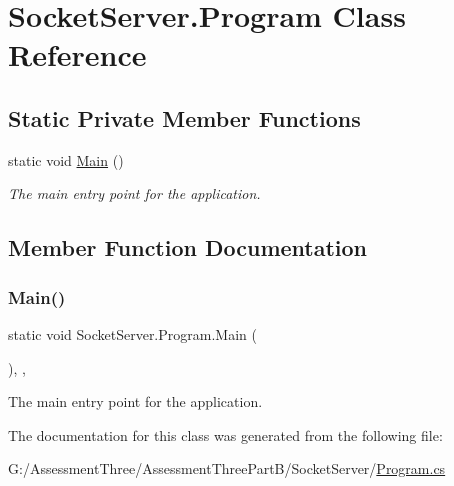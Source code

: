 \hypertarget{class_socket_server_1_1_program}{}\section{Socket\+Server.\+Program Class Reference}
\label{class_socket_server_1_1_program}
\subsection*{Static Private Member Functions}
\begin{DoxyCompactItemize}
\item 
static void \hyperlink{class_socket_server_1_1_program_aa4e55dd6631d9e57cff1547e14ca7853}{Main} ()
\begin{DoxyCompactList}\small\item\em The main entry point for the application. \end{DoxyCompactList}\end{DoxyCompactItemize}


\subsection{Member Function Documentation}
\mbox{\label{class_socket_server_1_1_program_aa4e55dd6631d9e57cff1547e14ca7853}} 
\subsubsection{\texorpdfstring{Main()}{Main()}}
{\footnotesize\ttfamily static void Socket\+Server.\+Program.\+Main (\begin{DoxyParamCaption}{ }\end{DoxyParamCaption})\hspace{0.3cm}{\ttfamily [inline]}, {\ttfamily [static]}, {\ttfamily [private]}}



The main entry point for the application. 



The documentation for this class was generated from the following file\+:\begin{DoxyCompactItemize}
\item 
G\+:/\+Assessment\+Three/\+Assessment\+Three\+Part\+B/\+Socket\+Server/\hyperlink{_socket_server_2_program_8cs}{Program.\+cs}\end{DoxyCompactItemize}
